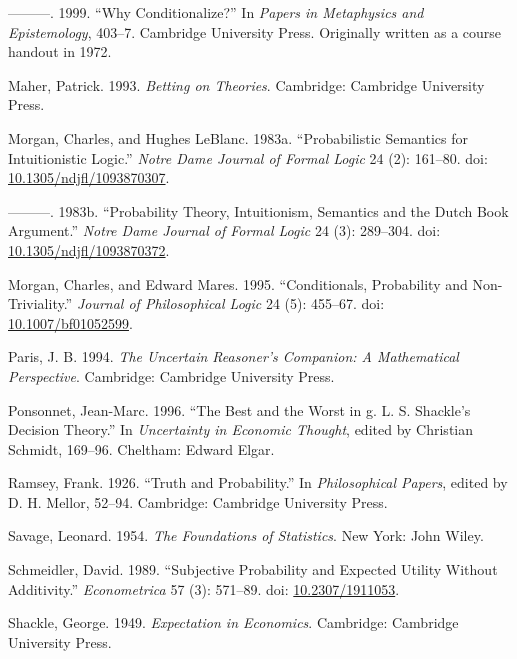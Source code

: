 \documentclass[
  11pt,
  letterpaper,
  DIV=11,
  numbers=noendperiod,
  twoside]{scrartcl}
\newlength{\cslhangindent}
\newenvironment{CSLReferences}[2] %
 {\begin{list}{}{%
  \setlength{\itemindent}{0pt}
  \setlength{\leftmargin}{0pt}
  \setlength{\parsep}{0pt}
  \ifodd #1
   \setlength{\leftmargin}{\cslhangindent}
   \setlength{\itemindent}{-1\cslhangindent}
  \fi
  \setlength{\itemsep}{#2\baselineskip}}}
 {\end{list}}
\begin{document}
\begin{CSLReferences}{1}{0}
---------. 1999. {``Why Conditionalize?''} In \emph{Papers in
Metaphysics and Epistemology}, 403--7. Cambridge University Press.
Originally written as a course handout in 1972.

Maher, Patrick. 1993. \emph{Betting on Theories}. Cambridge: Cambridge
University Press.

Morgan, Charles, and Hughes LeBlanc. 1983a. {``Probabilistic Semantics
for Intuitionistic Logic.''} \emph{Notre Dame Journal of Formal Logic}
24 (2): 161--80. doi:
\href{https://doi.org/10.1305/ndjfl/1093870307}{10.1305/ndjfl/1093870307}.

---------. 1983b. {``Probability Theory, Intuitionism, Semantics and the
Dutch Book Argument.''} \emph{Notre Dame Journal of Formal Logic} 24
(3): 289--304. doi:
\href{https://doi.org/10.1305/ndjfl/1093870372}{10.1305/ndjfl/1093870372}.

Morgan, Charles, and Edward Mares. 1995. {``Conditionals, Probability
and Non-Triviality.''} \emph{Journal of Philosophical Logic} 24 (5):
455--67. doi:
\href{https://doi.org/10.1007/bf01052599}{10.1007/bf01052599}.

Paris, J. B. 1994. \emph{The Uncertain Reasoner's Companion: A
Mathematical Perspective}. Cambridge: Cambridge University Press.

Ponsonnet, Jean-Marc. 1996. {``The Best and the Worst in g. L. S.
Shackle's Decision Theory.''} In \emph{Uncertainty in Economic Thought},
edited by Christian Schmidt, 169--96. Cheltham: Edward Elgar.

Ramsey, Frank. 1926. {``Truth and Probability.''} In \emph{Philosophical
Papers}, edited by D. H. Mellor, 52--94. Cambridge: Cambridge University
Press.

Savage, Leonard. 1954. \emph{The Foundations of Statistics}. New York:
John Wiley.

Schmeidler, David. 1989. {``Subjective Probability and Expected Utility
Without Additivity.''} \emph{Econometrica} 57 (3): 571--89. doi:
\href{https://doi.org/10.2307/1911053}{10.2307/1911053}.

Shackle, George. 1949. \emph{Expectation in Economics}. Cambridge:
Cambridge University Press.


\end{CSLReferences}
\end{document}
